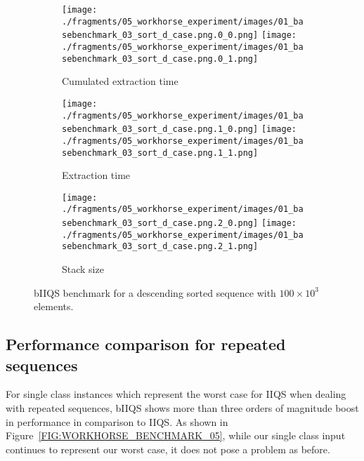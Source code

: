 \begin{figure}

    \centering
    \begin{subfigure}[b]{\textwidth}
        \centering
        \texttt{[image: ./fragments/05\_workhorse\_experiment/images/01\_basebenchmark\_03\_sort\_d\_case.png.0\_0.png]}
        \texttt{[image: ./fragments/05\_workhorse\_experiment/images/01\_basebenchmark\_03\_sort\_d\_case.png.0\_1.png]}
        \caption{Cumulated extraction time}
        \label{FIG:WORKHORSE_BENCHMARK_03__0_0}
    \end{subfigure}

    \begin{subfigure}[b]{\textwidth}
        \centering
        \texttt{[image: ./fragments/05\_workhorse\_experiment/images/01\_basebenchmark\_03\_sort\_d\_case.png.1\_0.png]}
        \texttt{[image: ./fragments/05\_workhorse\_experiment/images/01\_basebenchmark\_03\_sort\_d\_case.png.1\_1.png]}
        \caption{Extraction time}
        \label{FIG:WORKHORSE_BENCHMARK_03__0_0}
    \end{subfigure}

    \begin{subfigure}[b]{\textwidth}
        \centering
        \texttt{[image: ./fragments/05\_workhorse\_experiment/images/01\_basebenchmark\_03\_sort\_d\_case.png.2\_0.png]}
        \texttt{[image: ./fragments/05\_workhorse\_experiment/images/01\_basebenchmark\_03\_sort\_d\_case.png.2\_1.png]}
        \caption{Stack size}
        \label{FIG:WORKHORSE_BENCHMARK_03__0_0}
    \end{subfigure}
    
    \caption{bIIQS benchmark for a descending sorted sequence with $100\times10^3$ elements.}
       \label{FIG:WORKHORSE_BENCHMARK_03}
\end{figure}


\subsection{Performance comparison for repeated sequences}

For single class instances which represent the worst case for IIQS when dealing with repeated sequences, bIIQS shows more than three orders of magnitude boost in performance in comparison to IIQS. As shown in Figure~\ref{FIG:WORKHORSE_BENCHMARK_05}, while our single class input continues to represent our worst case, it does not pose a problem as before. \\

